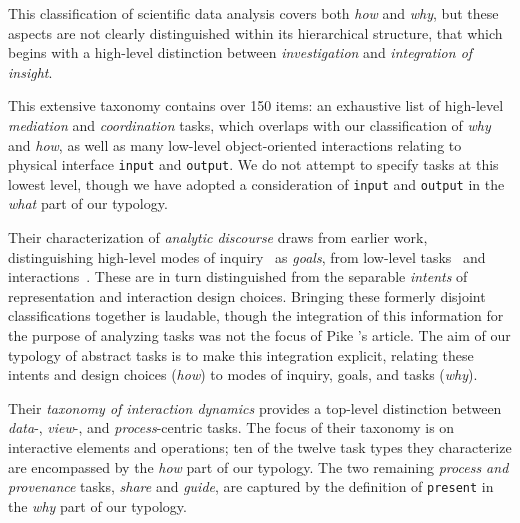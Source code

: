 This classification of scientific data analysis covers both {\it how} and {\it why}, but these aspects are not clearly distinguished within its hierarchical structure, that which begins with a high-level distinction between {\it investigation} and {\it integration of insight}.

This extensive taxonomy contains over 150 items: an exhaustive list of high-level {\it mediation} and {\it coordination} tasks, which overlaps with our classification of {\it why} and {\it how}, as well as many low-level object-oriented interactions relating to physical interface {\tt input} and {\tt output}.
We do not attempt to specify tasks at this lowest level, though we have adopted a consideration of {\tt input} and {\tt output} in the {\it what} part of our typology.

Their characterization of {\it analytic discourse} draws from earlier work, distinguishing high-level modes of inquiry~\cite{Amar2004} as {\it goals}, from low-level tasks~\cite{Amar2005} and interactions~\cite{Yi2007}.
These are in turn distinguished from the separable {\it intents} of representation and interaction design choices.
Bringing these formerly disjoint classifications together is laudable, though the integration of this information for the purpose of analyzing tasks was not the focus of Pike \etal's article.
The aim of our typology of abstract tasks is to make this integration explicit, relating these intents and design choices ({\it how}) to modes of inquiry, goals, and tasks ({\it why}).

Their {\it taxonomy of interaction dynamics} provides a top-level distinction between {\it data}-, {\it view}-, and {\it process}-centric tasks.
The focus of their taxonomy is on interactive elements and operations; ten of the twelve task types they characterize are encompassed by the {\it how} part of our typology.
The two remaining {\it process and provenance} tasks, {\it share} and {\it guide}, are captured by the definition of {\tt present} in the {\it why} part of our typology.

